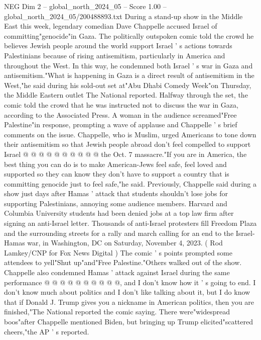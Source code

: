 \begin{textsample}{NEG Dim 2 – global\_north\_2024\_05 – Score 1.00 – global\_north\_2024\_05/200488893.txt}  \label{ex:f2_neg_060}
During a stand-up show in the Middle East this week, legendary comedian Dave Chappelle accused Israel of committing"genocide"in Gaza.
The politically outspoken comic told the crowd he believes Jewish people around the world support Israel ' s actions towards Palestinians because of rising antisemitism, particularly in America and throughout the West.
In this way, he condemned both Israel ' s war in Gaza and antisemitism."What is happening in Gaza is a direct result of antisemitism in the West,"he said during his sold-out set at"Abu Dhabi Comedy Week"on Thursday, the Middle Eastern outlet The National reported.
Halfway through the set, the comic told the crowd that he was instructed not to discuss the war in Gaza, according to the Associated Press.
A woman in the audience screamed"Free Palestine"in response, prompting a wave of applause and Chappelle ' s brief comments on the issue.
Chappelle, who is Muslim, urged Americans to tone down their antisemitism so that Jewish people abroad don't feel compelled to support Israel @ @ @ @ @ @ @ @ @ @ the Oct. 7 massacre."If you are in America, the best thing you can do is to make American-Jews feel safe, feel loved and supported so they can know they don't have to support a country that is committing genocide just to feel safe,"he said.
Previously, Chappelle said during a show just days after Hamas ' attack that students shouldn't lose jobs for supporting Palestinians, annoying some audience members.
Harvard and Columbia University students had been denied jobs at a top law firm after signing an anti-Israel letter.
Thousands of anti-Israel protesters fill Freedom Plaza and the surrounding streets for a rally and march calling for an end to the Israel-Hamas war, in Washington, DC on Saturday, November 4, 2023. ( Rod Lamkey/CNP for Fox News Digital ) The comic ' s points prompted some attendees to yell"Shut up"and"Free Palestine."Others walked out of the show.
Chappelle also condemned Hamas ' attack against Israel during the same performance @ @ @ @ @ @ @ @ @ @, and I don't know how it ' s going to end.
I don't know much about politics and I don't like talking about it, but I do know that if Donald J.
Trump gives you a nickname in American politics, then you are finished,"The National reported the comic saying.
There were"widespread boos"after Chappelle mentioned Biden, but bringing up Trump elicited"scattered cheers,"the AP ' s reported.

\end{textsample}
